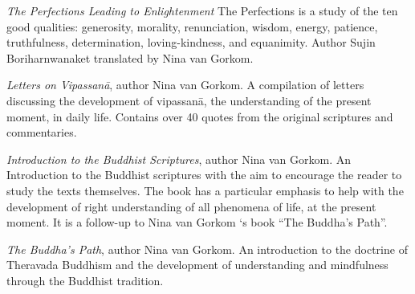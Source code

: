 \begin{description}
\item \emph{The Perfections Leading to Enlightenment} The Perfections is a study of the ten good qualities: generosity, morality, renunciation, wisdom, energy, patience, truthfulness, determination, loving-kindness,
and equanimity.  Author Sujin Boriharnwanaket translated by Nina van Gorkom.

\item \emph{Letters on Vipassanā}, author Nina van Gorkom. A compilation of letters discussing the development of vipassanā, the understanding of the present moment, in daily life. Contains over 40 quotes from the original scriptures and commentaries.

\item \emph{Introduction to the Buddhist Scriptures}, author Nina van Gorkom. An Introduction to the Buddhist scriptures with the aim to encourage the reader to study the texts themselves. The book has a particular emphasis to help with the development of right understanding of all phenomena of life, at the present moment. It is a follow-up to Nina van Gorkom ‘s book ``The Buddha’s Path''.

\item \emph{The Buddha’s Path}, author Nina van Gorkom. An introduction to the doctrine of Theravada Buddhism and the development of understanding and mindfulness through the Buddhist tradition.
\end{description}